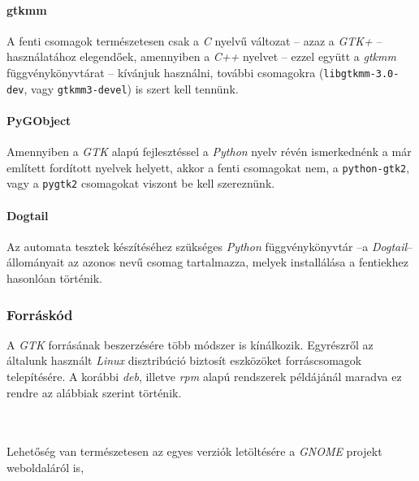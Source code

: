 \paragraph{gtkmm}

A fenti csomagok természetesen csak a \textit{C} nyelvű változat -- azaz a \textit{GTK+} -- használatához elegendőek, amennyiben a \textit{C++} nyelvet -- ezzel együtt a \textit{gtkmm} függvénykönyvtárat -- kívánjuk használni, további csomagokra (\texttt{libgtkmm-3.0-dev}, vagy \texttt{gtkmm3-devel}) is szert kell tennünk.

\paragraph{PyGObject}

Amennyiben a \textit{GTK} alapú fejlesztéssel a \textit{Python} nyelv révén ismerkednénk a már említett fordított nyelvek helyett, akkor a fenti csomagokat nem, a \texttt{python-gtk2}, vagy a \texttt{pygtk2} csomagokat viszont be kell szereznünk.

\paragraph{Dogtail}

Az automata tesztek készítéséhez szükséges \textit{Python} függvénykönyvtár --a \textit{Dogtail}-- állományait az azonos nevű csomag tartalmazza, melyek installálása a fentiekhez hasonlóan történik.

\subsubsection{Forráskód}

A \textit{GTK} forrásának beszerzésére több módszer is kínálkozik. Egyrészről az általunk használt \textit{Linux} disztribúció biztosít eszközöket forráscsomagok telepítésére. A korábbi \textit{deb}, illetve \textit{rpm} alapú rendszerek példájánál maradva ez rendre az alábbiak szerint történik.

\\
\\

Lehetőség van természetesen az egyes verziók letöltésére a \textit{GNOME} projekt weboldaláról is,

\\
\\

